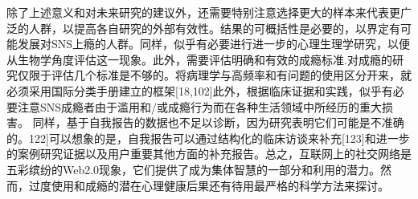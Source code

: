 除了上述意义和对未来研究的建议外，还需要特别注意选择更大的样本来代表更广泛的人群，以提高各自研究的外部有效性。结果的可概括性是必要的，以界定有可能发展对SNS上瘾的人群。同样，似乎有必要进行进一步的心理生理学研究，以便从生物学角度评估这一现象。此外，需要评估明确和有效的成瘾标准.对成瘾的研究仅限于评估几个标准是不够的。将病理学与高频率和有问题的使用区分开来，就必须采用国际分类手册建立的框架[18,102]此外，根据临床证据和实践，似乎有必要注意SNS成瘾者由于滥用和/或成瘾行为而在各种生活领域中所经历的重大损害。
同样，基于自我报告的数据也不足以诊断，因为研究表明它们可能是不准确的。122]可以想象的是，自我报告可以通过结构化的临床访谈来补充[123]和进一步的案例研究证据以及用户重要其他方面的补充报告。总之，互联网上的社交网络是五彩缤纷的Web2.0现象，它们提供了成为集体智慧的一部分和利用的潜力。然而，过度使用和成瘾的潜在心理健康后果还有待用最严格的科学方法来探讨。
   
























